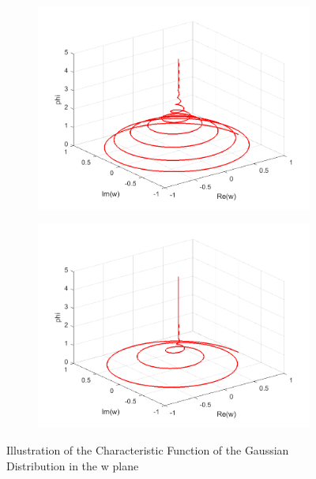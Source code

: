 \documentclass[a4paper,11pt]{article}
\begin{document}
\begin{figure}[!h]
\begin{subfigure}[c]{0.3\textwidth}
\end{subfigure}
\begin{subfigure}[c]{0.3\textwidth}
\includegraphics[width=\linewidth]{plot7_musg41.png}
\end{subfigure}
\begin{subfigure}[c]{0.3\textwidth}
\includegraphics[width=\linewidth]{plot7_musg42.png}
\end{subfigure}
\caption{Illustration of the Characteristic Function of the Gaussian Distribution in the w plane}
\label{wplane2}
\end{figure}
\newpage
\end{document}
